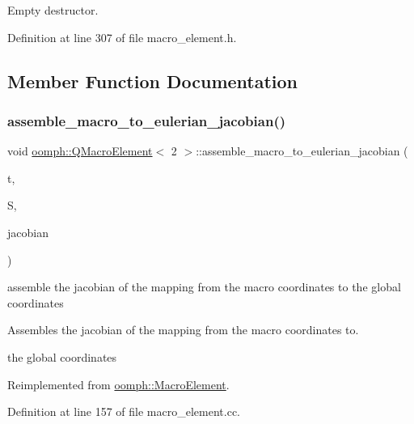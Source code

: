 Empty destructor. 



Definition at line 307 of file macro\+\_\+element.\+h.



\subsection{Member Function Documentation}
\mbox{\label{classoomph_1_1QMacroElement_3_012_01_4_a74aaa1b631144e956b5f61e8d0cd9f05}} 
\subsubsection{\texorpdfstring{assemble\+\_\+macro\+\_\+to\+\_\+eulerian\+\_\+jacobian()}{assemble\_macro\_to\_eulerian\_jacobian()}}
{\footnotesize\ttfamily void \hyperlink{classoomph_1_1QMacroElement}{oomph\+::\+Q\+Macro\+Element}$<$ 2 $>$\+::assemble\+\_\+macro\+\_\+to\+\_\+eulerian\+\_\+jacobian (\begin{DoxyParamCaption}\item[{const unsigned \&}]{t,  }\item[{const \hyperlink{classoomph_1_1Vector}{Vector}$<$ double $>$ \&}]{S,  }\item[{\hyperlink{classoomph_1_1DenseMatrix}{Dense\+Matrix}$<$ double $>$ \&}]{jacobian }\end{DoxyParamCaption})\hspace{0.3cm}{\ttfamily [virtual]}}



assemble the jacobian of the mapping from the macro coordinates to the global coordinates 

Assembles the jacobian of the mapping from the macro coordinates to.

the global coordinates 

Reimplemented from \hyperlink{classoomph_1_1MacroElement_acd465f4065dee7acfbb36d307ad691f9}{oomph\+::\+Macro\+Element}.



Definition at line 157 of file macro\+\_\+element.\+cc.



